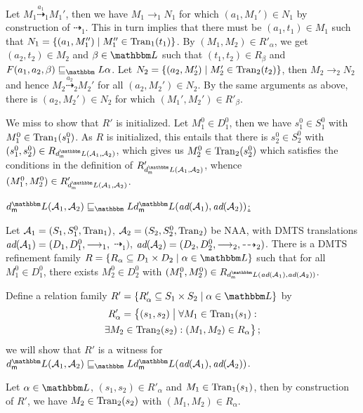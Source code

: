 \documentclass[twocolumn]{svjour3-dummy}
\newcommand*{\must}[1]{\overset{#1}{\longrightarrow}}
\newcommand*{\omust}{\mathord{\must{}}}
\newcommand*{\may}[1]{\overset{#1}{\dashrightarrow}}
\newcommand*{\omay}{\mathord{\may{}}}
\newcommand*\NAA{NAA\xspace}
\newcommand*\cA{\mathcal A}
\newcommand*\Tran{\textup{\textrm{Tran}}}
\newcommand*\LL{\mathbbm L}
\begin{document}
  Let $M_1\may{ a_1}_1 M_1'$, then we have $M_1\must{}_1 N_1$ for which
  $( a_1, M_1')\in N_1$ by construction of $\omay_1$.  This in turn
  implies that there must be $( a_1, t_1)\in M_1$ such that $N_1=\{(
  a_1, M_1'')\mid M_1''\in \Tran_1( t_1)\}$.  By $( M_1, M_2)\in
  R'_\alpha$, we get $( a_2, t_2)\in M_2$ and $\beta\in \LL$ such that
  $( t_1, t_2)\in R_\beta$ and $F( a_1, a_2, \beta)\sqsubseteq_\LL
  \alpha$.  Let $N_2=\{( a_2, M_2')\mid M_2'\in \Tran_2( t_2)\}$, then
  $M_2\must{}_2 N_2$ and hence $M_2\may{ a_2}_2 M_2'$ for all $( a_2,
  M_2')\in N_2$.  By the same arguments as above, there is $( a_2,
  M_2')\in N_2$ for which $( M_1', M_2')\in R'_\beta$.

  We miss to show that $R'$ is initialized.  Let $M_1^0\in D_1^0$, then
  we have $s_1^0\in S_1^0$ with $M_1^0\in \Tran_1( s_1^0)$.  As $R$ is
  initialized, this entails that there is $s_2^0\in S_2^0$ with $(
  s_1^0, s_2^0)\in R_{ \mdl( \cA_1, \cA_2)}$, which gives us $M_2^0\in
  \Tran_2( s_2^0)$ which satisfies the conditions in the definition of
  $R'_{ \mdl( \cA_1, \cA_2)}$, whence $( M_1^0, M_2^0)\in R'_{ \mdl(
    \cA_1, \cA_2)}$.

  \pagebreak \noindent \underline{$\mdl( \cA_1, \cA_2)\sqsubseteq_\LL
    \mdl( \bd( \cA_1), \bd( \cA_2))$:}

  Let $\cA_1=( S_1, S^0_1, \Tran_1)$, $\cA_2=( S_2, S^0_2, \Tran_2)$ be
  \NAA, with DMTS translations $\bd( \cA_1)=( D_1, D^0_1, \omust_1,$
  $\omay_1)$, $\bd( \cA_2)=( D_2, D^0_2, \omust_2, \omay_2)$.  There is
  a DMTS refinement family $R=\{ R_\alpha\subseteq D_1\times D_2\mid
  \alpha\in \LL\}$ such that for all $M_1^0\in D_1^0$, there exists
  $M_2^0\in D_2^0$ with $( M_1^0, M_2^0)\in R_{ \mdl( \bd( \cA_1), \bd(
    \cA_2))}$.

  Define a relation family $R'=\{ R'_\alpha\subseteq S_1\times S_2\mid
  \alpha\in \LL\}$ by
  \begin{multline*}
    R'_\alpha= \big\{ ( s_1, s_2)\bigmid \forall M_1\in \Tran_1( s_1):
    \\
    \exists M_2\in \Tran_2( s_2):( M_1, M_2)\in R_\alpha\big\}\,;
  \end{multline*}
  we will show that $R'$ is a witness for $\mdl( \cA_1,
  \cA_2)\sqsubseteq_\LL \mdl( \bd( \cA_1), \bd( \cA_2))$.

  Let $\alpha\in \LL$, $( s_1, s_2)\in R'_\alpha$ and $M_1\in \Tran_1(
  s_1)$, then by construction of $R'$, we have $M_2\in \Tran_2( s_2)$
  with $( M_1, M_2)\in R_\alpha$.
\end{document}
